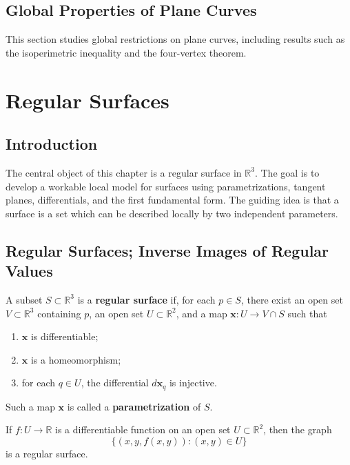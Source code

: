 \documentclass[12pt, oneside]{book}
\begin{document}
\section{Global Properties of Plane Curves}

\begin{remark}
    This section studies global restrictions on plane curves, including results
    such as the isoperimetric inequality and the four-vertex theorem.
\end{remark}

\chapter{Regular Surfaces}

\section{Introduction}

The central object of this chapter is a regular surface in $\mathbb{R}^3$.
The goal is to develop a workable local model for surfaces using
parametrizations, tangent planes, differentials, and the first fundamental form.
The guiding idea is that a surface is a set which can be described locally by
two independent parameters.

\section{Regular Surfaces; Inverse Images of Regular Values}

\begin{definition}
    A subset $S\subset \mathbb{R}^3$ is a \textbf{regular surface} if, for each
    $p\in S$, there exist an open set $V\subset \mathbb{R}^3$ containing $p$,
    an open set $U\subset \mathbb{R}^2$, and a map
    $\mathbf{x}:U\rightarrow V\cap S$ such that
    \begin{enumerate}[label=(\roman*)]
        \item $\mathbf{x}$ is differentiable;
        \item $\mathbf{x}$ is a homeomorphism;
        \item for each $q\in U$, the differential $d\mathbf{x}_q$ is injective.
    \end{enumerate}
    Such a map $\mathbf{x}$ is called a \textbf{parametrization} of $S$.
\end{definition}

\begin{proposition}
    If $f:U\rightarrow \mathbb{R}$ is a differentiable function on an open set
    $U\subset \mathbb{R}^2$, then the graph
    \[
        \{(x,y,f(x,y)):(x,y)\in U\}
    \]
    is a regular surface.
\end{proposition}
\end{document}

